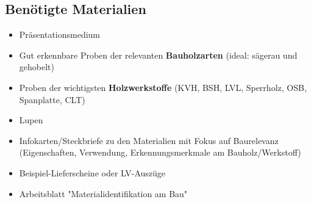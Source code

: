 \documentclass[12pt, a4paper]{article}
\begin{document}
\subsection{Benötigte Materialien}
\begin{itemize}
    \item Präsentationsmedium
    \item Gut erkennbare Proben der relevanten \textbf{Bauholzarten} (ideal: sägerau und gehobelt)
    \item Proben der wichtigsten \textbf{Holzwerkstoffe} (KVH, BSH, LVL, Sperrholz, OSB, Spanplatte, CLT)
    \item Lupen
    \item Infokarten/Steckbriefe zu den Materialien mit Fokus auf Baurelevanz (Eigenschaften, Verwendung, Erkennungsmerkmale am Bauholz/Werkstoff)
    \item Beispiel-Lieferscheine oder LV-Auszüge
    \item Arbeitsblatt "Materialidentifikation am Bau"
\end{itemize}
\end{document}
